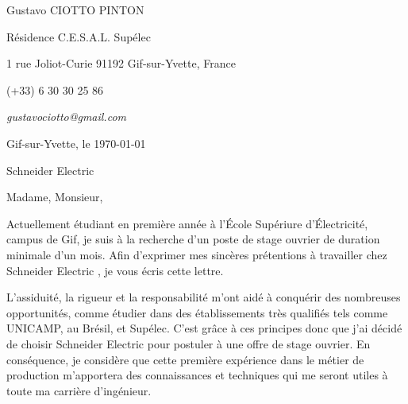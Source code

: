 \documentclass[12pt, a4paper]{article}
\newcommand{\entreprise}{Schneider Electric }
\newcommand{\offreReference}{STAGE1EREANNEE}
\newcommand{\contactEntreprise}{Madame, Monsieur}
\newcommand{\contactEntrepriseGender}{Madame, Monsieur}
\newcommand{\valeursImportantes}{L'assiduité, la rigueur et la responsabilité }
\newcommand{\metier}{le métier de production }
\begin{document}
\pagestyle{empty} 

Gustavo CIOTTO PINTON

Résidence C.E.S.A.L. Supélec

1 rue Joliot-Curie 91192 Gif-sur-Yvette, France

(+33) 6 30 30 25 86	

\textit{gustavociotto@gmail.com}

\vspace{12pt}



\begin{flushright}
Gif-sur-Yvette, le \today


\entreprise


\end{flushright}

\contactEntrepriseGender ,

\vspace{12pt}


Actuellement étudiant en première année à l'École Supériure d'Électricité,
campus de Gif, je suis à la recherche d'un poste de stage ouvrier de duration
minimale d'un mois. Afin d'exprimer mes sincères prétentions à travailler chez
\entreprise, je vous écris cette lettre.

\vspace{12pt}

\valeursImportantes m'ont aidé à conquérir des nombreuses opportunités, comme
étudier dans des établissements très qualifiés tels comme UNICAMP, au Brésil,
et Supélec.
C'est grâce à ces principes donc que j'ai décidé de choisir \entreprise 
pour postuler à une offre de stage ouvrier. 
En conséquence, je considère que cette première expérience dans \metier
m'apportera des connaissances et techniques qui me seront utiles à toute ma
carrière d'ingénieur.
\end{document}
